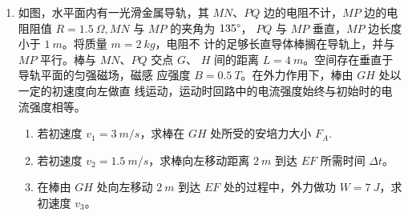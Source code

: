 \begin{enumerate}


\item 
{}
如图，水平面内有一光滑金属导轨，其 $ MN $、$ PQ $ 边的电阻不计，$ MP $ 边的电阻阻值
$ R=1.5 \ \Omega ,MN $ 与 $ MP $ 的夹角为 $ 135 \degree $， $ PQ $ 与 $ MP $ 垂直，$ MP $ 边长度小于 $ 1 \ m $。将质量 $ m=2 \ kg $，电阻不
计的足够长直导体棒搁在导轨上，并与 $ MP $ 平行。棒与 $ MN $、$ PQ $ 交点
$ G $、 $ H $ 间的距离 $ L=4 \ m $。空间存在垂直于导轨平面的匀强磁场，磁感
应强度 $ B=0.5 \ T $。在外力作用下，棒由 $ GH $ 处以一定的初速度向左做直
线运动，运动时回路中的电流强度始终与初始时的电流强度相等。
\begin{enumerate}
\item
若初速度 $ v_{1} =3 \ m /s $，求棒在 $ GH $ 处所受的安培力大小 $ F_{A} $.

\item 
若初速度 $ v_{2} =1.5 \ m /s $，求棒向左移动距离 $ 2 \ m $ 到达 $ EF $ 所需时间 $ \Delta t $。

\item 
在棒由 $ GH $ 处向左移动 $ 2 \ m $ 到达 $ EF $ 处的过程中，外力做功 $ W=7 \ J $，求初速度 $ v_{3} $。



\end{enumerate}
\begin{figure}[h!]
\flushright

\end{figure}



\end{enumerate}
